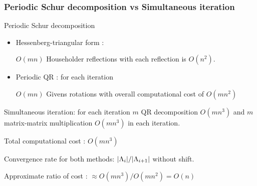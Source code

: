 \documentclass[mathserif, handout]{beamer}
\begin{document}


\begin{frame}
  \frametitle{Periodic Schur decomposition vs Simultaneous iteration}
  \begin{block}{Periodic Schur decomposition}

    \begin{itemize}
    \item {\color{cyan} Hessenberg-triangular form} :

      $O(mn)$ Householder reflections
      with each reflection is $O(n^{2})$.
    \item {\color{cyan} Periodic QR} : for each iteration

      $O(mn)$
      Givens rotations with overall computational cost of $O(mn^{2})$
    \end{itemize}
  \end{block}

  \pause

  \begin{block}{  Simultaneous iteration: for each iteration}
    $m$ {\color{cyan} QR decomposition}
    $O(mn^{3})$ and $m$ {\color{cyan} matrix-matrix multiplication}
    $O(mn^{3})$ in each iteration.

    Total computational cost : $O(mn^{3})$
  \end{block}

  \pause

  Convergence  rate for both methods:
  $|\Lambda_{i}|/|\Lambda_{i+1}|$  without shift.

  Approximate ratio of cost : $\approx O(mn^3)/O(mn^2) = O(n)$

\end{frame}
\end{document}
